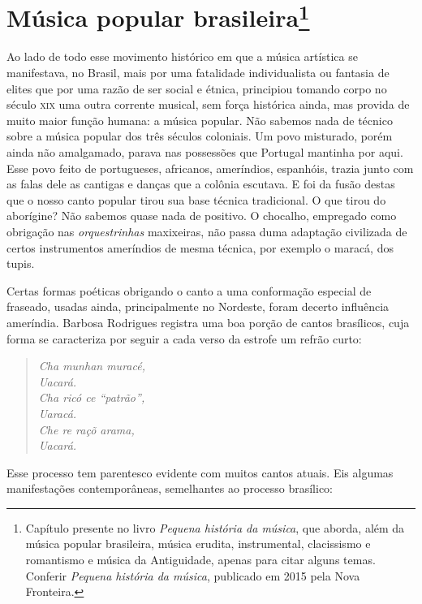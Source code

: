 \chapter{Música popular brasileira\footnote{Capítulo presente no livro \textit{Pequena história da música}, que aborda, além da música popular brasileira, música erudita, instrumental, clacissismo e romantismo e música da Antiguidade, apenas para citar alguns temas. Conferir \textit{Pequena história da música}, publicado em 2015 pela Nova Fronteira.}}


Ao lado de todo esse movimento histórico em que a música artística se
manifestava, no Brasil, mais por uma fatalidade individualista ou
fantasia de elites que por uma razão de ser social e étnica, principiou
tomando corpo no século \textsc{xix} uma outra corrente musical, sem força
histórica ainda, mas provida de muito maior função humana: a música
popular. Não sabemos nada de técnico sobre a música popular dos três
séculos coloniais. Um povo misturado, porém ainda não amalgamado, parava
nas possessões que Portugal mantinha por aqui. Esse povo feito de
portugueses, africanos, ameríndios, espanhóis, trazia junto com as falas
dele as cantigas e danças que a colônia escutava. E foi da fusão destas
que o nosso canto popular tirou sua base técnica tradicional. O que
tirou do aborígine? Não sabemos quase nada de positivo. O chocalho,
empregado como obrigação nas \textit{orquestrinhas} maxixeiras, não passa duma
adaptação civilizada de certos instrumentos ameríndios de mesma técnica,
por exemplo o maracá, dos tupis.

Certas formas poéticas obrigando o canto a uma conformação especial de
fraseado, usadas ainda, principalmente no Nordeste, foram decerto
influência ameríndia. Barbosa Rodrigues registra uma boa porção de
cantos brasílicos, cuja forma se caracteriza por seguir a cada verso da
estrofe um refrão curto:

\begin{verse}
\small{
\textit{Cha munhan muracé,\\
Uacará.\\
Cha ricó ce ``patrão'',\\
Uaracá.\\
Che re raçõ arama,\\
Uacará.}}
\end{verse}

Esse processo tem parentesco evidente com muitos cantos atuais. Eis
algumas manifestações contemporâneas, semelhantes ao processo brasílico:

